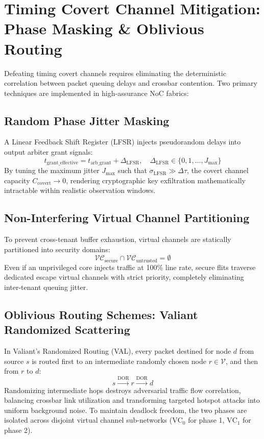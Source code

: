 \section{Timing Covert Channel Mitigation: Phase Masking \& Oblivious Routing}
\label{sec:timing-covert-defense}

Defeating timing covert channels requires eliminating the deterministic correlation between packet queuing delays and crossbar contention. Two primary techniques are implemented in high-assurance NoC fabrics:

\subsection{Random Phase Jitter Masking}
A Linear Feedback Shift Register (LFSR) injects pseudorandom delays into output arbiter grant signals:
\begin{equation}
t_{\mathrm{grant\_effective}} = t_{\mathrm{arb\_grant}} + \Delta_{\mathrm{LFSR}}, \quad \Delta_{\mathrm{LFSR}} \in \{0, 1, \dots, J_{\max}\}
\end{equation}
By tuning the maximum jitter $J_{\max}$ such that $\sigma_{\mathrm{LFSR}} \gg \Delta \tau$, the covert channel capacity $C_{\mathrm{covert}} \to 0$, rendering cryptographic key exfiltration mathematically intractable within realistic observation windows.

\subsection{Non-Interfering Virtual Channel Partitioning}
To prevent cross-tenant buffer exhaustion, virtual channels are statically partitioned into security domains:
\begin{equation}
\mathcal{VC}_{\mathrm{secure}} \cap \mathcal{VC}_{\mathrm{untrusted}} = \emptyset
\end{equation}
Even if an unprivileged core injects traffic at 100\% line rate, secure flits traverse dedicated escape virtual channels with strict priority, completely eliminating inter-tenant queuing jitter.

\subsection{Oblivious Routing Schemes: Valiant Randomized Scattering}
In Valiant's Randomized Routing (VAL), every packet destined for node $d$ from source $s$ is routed first to an intermediate randomly chosen node $r \in \mathcal{V}$, and then from $r$ to $d$:
\begin{equation}
s \xrightarrow{\text{DOR}} r \xrightarrow{\text{DOR}} d
\end{equation}
Randomizing intermediate hops destroys adversarial traffic flow correlation, balancing crossbar link utilization and transforming targeted hotspot attacks into uniform background noise. To maintain deadlock freedom, the two phases are isolated across disjoint virtual channel sub-networks ($\mathrm{VC}_0$ for phase 1, $\mathrm{VC}_1$ for phase 2).

